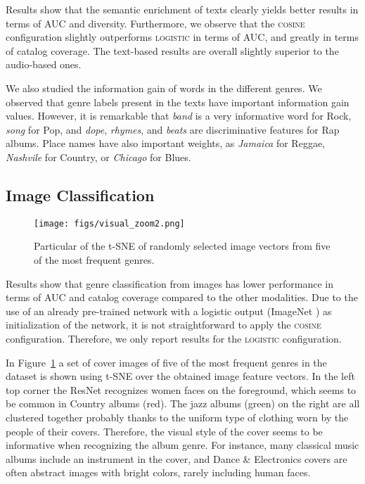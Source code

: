 \documentclass{article}
\begin{document}
Results show that the semantic enrichment of texts clearly yields better results in terms of AUC and diversity.
Furthermore, we observe that the \textsc{cosine} configuration slightly outperforms \textsc{logistic} in terms of AUC, and greatly in terms of catalog coverage. 
The text-based results are overall slightly superior to the audio-based ones. 

We also studied the information gain of words in the different genres. We observed that genre labels present in the texts have important information gain values. However, it is remarkable that \textit{band} is a very informative word for Rock, \textit{song} for Pop, and \textit{dope}, \textit{rhymes}, and \textit{beats} are discriminative features for Rap albums. Place names have also important weights, as \textit{Jamaica} for Reggae, \textit{Nashvile} for Country, or \textit{Chicago} for Blues.

\subsection{Image Classification}\label{sec:imageexp}


\begin{figure}
\centering
\texttt{[image: figs/visual\_zoom2.png]} \\ 
\caption{Particular of the t-SNE of randomly selected image vectors from five of the most frequent genres.}
\label{fig:tsne_visual}
\end{figure}

Results show that genre classification from images has lower performance in terms of AUC and catalog coverage compared to the other modalities. Due to the use of an already pre-trained network with a logistic output (ImageNet \cite{ILSVRC15}) as initialization of the network, it is not straightforward to apply the \textsc{cosine} configuration. Therefore, we only report results for the \textsc{logistic} configuration.

In Figure~\ref{fig:tsne_visual} a set of cover images of five of the most frequent genres in the dataset is shown using t-SNE over the obtained image feature vectors. 
In the left top corner the ResNet recognizes women faces on the foreground, which seems to be common in Country albums (red).
The jazz albums (green) on the right are all clustered together probably thanks to the uniform type of clothing worn by the people of their covers. 
Therefore, the visual style of the cover seems to be informative when recognizing the album genre.
For instance, many classical music albums include an instrument in the cover, and Dance \& Electronics covers are often abstract images with bright colors, rarely including human faces.
\end{document}
